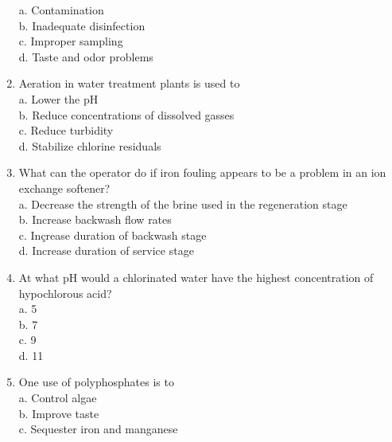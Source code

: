 \begin{enumerate}
a. Contamination\\

b. Inadequate disinfection\\

c. Improper sampling\\

d. Taste and odor problems\\

\item Aeration in water treatment plants is used to\\

a. Lower the $\mathrm{pH}$\\

b. Reduce concentrations of dissolved gasses\\

c. Reduce turbidity\\

d. Stabilize chlorine residuals


\item What can the operator do if iron fouling appears to be a problem in an ion exchange softener?\\

a. Decrease the strength of the brine used in the regeneration stage\\

b. Increase backwash flow rates\\

c. Inçrease duration of backwash stage\\

d. Increase duration of service stage\\


  \item At what $\mathrm{pH}$ would a chlorinated water have the highest concentration of hypochlorous acid?\\
a. 5\\
b. 7\\
c. 9\\
d. 11\\

\item One use of polyphosphates is to\\



a. Control algae\\

b. Improve taste\\

c. Sequester iron and manganese\\


\end{enumerate}

